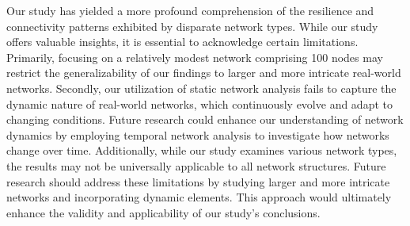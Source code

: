 \documentclass[conference]{IEEEtran} %
\begin{document}
Our study has yielded a more profound comprehension of the resilience and connectivity patterns exhibited by disparate network types. While our study offers valuable insights, it is essential to acknowledge certain limitations. Primarily, focusing on a relatively modest network comprising 100 nodes may restrict the generalizability of our findings to larger and more intricate real-world networks. Secondly, our utilization of static network analysis fails to capture the dynamic nature of real-world networks, which continuously evolve and adapt to changing conditions. Future research could enhance our understanding of network dynamics by employing temporal network analysis to investigate how networks change over time. Additionally, while our study examines various network types, the results may not be universally applicable to all network structures. Future research should address these limitations by studying larger and more intricate networks and incorporating dynamic elements. This approach would ultimately enhance the validity and applicability of our study's conclusions.

\balance



\end{document}
